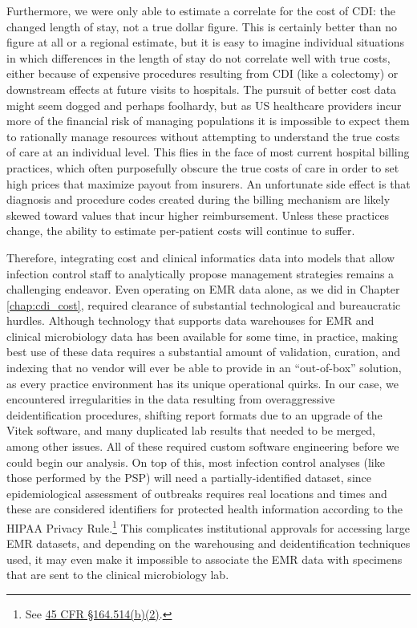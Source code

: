 Furthermore, we were only able to estimate a correlate for the cost of CDI: the changed length of stay, not a true dollar figure. This is certainly better than no figure at all or a regional estimate, but it is easy to imagine individual situations in which differences in the length of stay do not correlate well with true costs, either because of expensive procedures resulting from CDI (like a colectomy) or downstream effects at future visits to hospitals. The pursuit of better cost data might seem dogged and perhaps foolhardy, but as US healthcare providers incur more of the financial risk of managing populations\autocite{Shortell2015} it is impossible to expect them to rationally manage resources without attempting to understand the true costs of care at an individual level.\autocite{Hilsenrath2015} This flies in the face of most current hospital billing practices, which often purposefully obscure the true costs of care in order to set high prices that maximize payout from insurers.\autocite{Hilsenrath2015} An unfortunate side effect is that diagnosis and procedure codes created during the billing mechanism are likely skewed toward values that incur higher reimbursement.\autocite{Rhee2015,Romano1994} Unless these practices change, the ability to estimate per-patient costs will continue to suffer.

Therefore, integrating cost and clinical informatics data into models that allow infection control staff to analytically propose management strategies remains a challenging endeavor. Even operating on EMR data alone, as we did in Chapter \ref{chap:cdi_cost}, required clearance of substantial technological and bureaucratic hurdles. Although technology that supports data warehouses for EMR and clinical microbiology data has been available for some time,\autocite{Isniewski2003} in practice, making best use of these data requires a substantial amount of validation, curation, and indexing that no vendor will ever be able to provide in an ``out-of-box'' solution, as every practice environment has its unique operational quirks. In our case, we encountered irregularities in the data resulting from overaggressive deidentification procedures, shifting report formats due to an upgrade of the Vitek software, and many duplicated lab results that needed to be merged, among other issues. All of these required custom software engineering before we could begin our analysis. On top of this, most infection control analyses (like those performed by the PSP) will need a partially-identified dataset, since epidemiological assessment of outbreaks requires real locations and times and these are considered identifiers for protected health information according to the HIPAA Privacy Rule.\footnote{See \href{https://www.law.cornell.edu/cfr/text/45/164.514}{45 CFR §164.514(b)(2)}.} This complicates institutional approvals for accessing large EMR datasets, and depending on the warehousing and deidentification techniques used, it may even make it impossible to associate the EMR data with specimens that are sent to the clinical microbiology lab.


